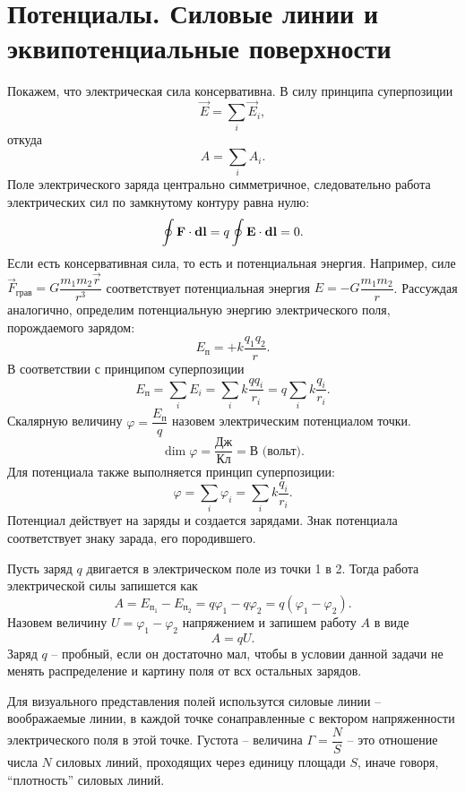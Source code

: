\section{Потенциалы. Силовые линии и эквипотенциальные поверхности}

	Покажем, что электрическая сила консервативна. В силу принципа суперпозиции
		$$\vec{E}=\sum_i \vec{E}_i,$$
	откуда
		$$A=\sum_i A_i.$$
	Поле электрического заряда центрально симметричное, следовательно работа электрических сил по замкнутому контуру равна нулю:
		$$\oint \text{\textbf{F}}\cdot\textbf{d}\text{\textbf{l}}=q\oint \text{\textbf{E}}\cdot\textbf{d}\text{\textbf{l}}=0.$$
	Если есть консервативная сила, то есть и потенциальная энергия. Например, силе $\vec{F}_{\text{грав}}=G\dfrac{m_1m_2\vec{r}}{r^3}$ соответствует потенциальная энергия $E=-G\dfrac{m_1m_2}{r}$. Рассуждая аналогично, определим потенциальную энергию электрического поля, порождаемого зарядом:
		$$E_{\text{п}}=+k\frac{q_1q_2}{r}.$$
	В соответствии с принципом суперпозиции
		$$E_{\text{п}}=\sum_i E_i=\sum_i k\frac{qq_i}{r_i}=q\sum_i k\frac{q_i}{r_i}.$$
	Скалярную величину $\varphi=\dfrac{E_{\text{п}}}{q}$ назовем электрическим потенциалом точки.
		$$\dim{\varphi}=\frac{\text{Дж}}{\text{Кл}}=\text{В (вольт)}.$$
	Для потенциала также выполняется принцип суперпозиции:
		$$\varphi=\sum_i \varphi_i=\sum_i k\frac{q_i}{r_i}.$$
	Потенциал действует на заряды и создается зарядами. Знак потенциала соответствует знаку зарада, его породившего. \par
	Пусть заряд $q$ двигается в электрическом поле из точки 1 в 2. Тогда работа электрической силы запишется как
		$$A=E_{\text{п}_{\text{1}}}-E_{\text{п}_{\text{2}}}=q\varphi_1-q\varphi_2=q(\varphi_1-\varphi_2).$$
	Назовем величину $U=\varphi_1-\varphi_2$ напряжением и запишем работу $A$ в виде 
		$$A=qU.$$
	Заряд $q$ -- пробный, если он достаточно мал, чтобы в условии данной задачи не менять распределение и картину поля от всх остальных зарядов.\par
	Для визуального представления полей использутся силовые линии -- воображаемые линии, в каждой точке сонаправленные с вектором напряженности электрического поля в этой точке. Густота -- величина $\Gamma=\dfrac{N}{S}$ -- это отношение числа $N$ силовых линий, проходящих через единицу площади $S$, иначе говоря, ``плотность'' силовых линий. 
